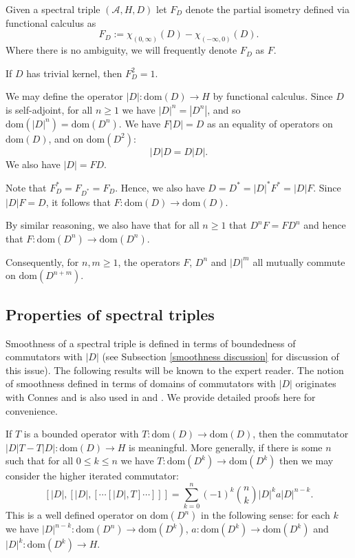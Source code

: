     \begin{defi}
    Given a spectral triple $(\mathcal{A},H,D)$ let $F_D$ denote the partial isometry defined via functional calculus as
    $$F_D := \chi_{(0,\infty)}(D)-\chi_{(-\infty,0)}(D).$$
    Where there is no ambiguity, we will frequently denote $F_D$ as $F$.        
    \end{defi}
    If $D$ has trivial kernel, then $F_D^2 = 1.$
    
    We may define the operator $|D|:\mathrm{dom}(D)\to H$ by functional calculus.
    Since $D$ is self-adjoint, for all $n\geq 1$ we have $|D|^n = |D^n|$, and so $\mathrm{dom}(|D|^n) = \mathrm{dom}(D^n)$.
    We have $F|D| = D$ as an equality of operators on $\mathrm{dom}(D)$, and on $\mathrm{dom}(D^2)$:
    \begin{equation*}
        |D|D = D|D|.
    \end{equation*}
    We also have $|D|=FD$.
    
    Note that $F_D^* = F_{D^*} = F_D$. Hence, we also have $D = D^*=|D|^*F^* = |D|F$.
    Since $|D|F = D$, it follows that $F:\mathrm{dom}(D)\to\mathrm{dom}(D)$.
    
    By similar reasoning, we also have that for all $n\geq 1$ that $D^{n}F = FD^{n}$ and hence that $F:\mathrm{dom}(D^n)\to \mathrm{dom}(D^n)$.
    
    
    Consequently, for $n,m \geq 1$, the operators $F$, $D^n$ and $|D|^m$ all mutually commute on $\mathrm{dom}(D^{n+m})$.
    
\subsection{Properties of spectral triples}
    Smoothness of a spectral triple is defined in terms of boundedness of commutators with $|D|$ (see Subsection \ref{smoothness discussion} for discussion of this issue).
    The following results will be known to the expert reader. The notion of smoothness defined in terms of domains of commutators with $|D|$ originates with Connes \cite[Section 1]{Connes-original-spectral-1995} and
    is also used in \cite{Connes-Moscovici} and \cite[Section 1.3]{CGRS2}. We provide detailed proofs here for convenience.
    
    If $T$ is a bounded operator with $T:\mathrm{dom}(D)\to \mathrm{dom}(D)$, then the commutator
    $|D|T-T|D|:\mathrm{dom}(D)\to H$ is meaningful. More generally, if there is some $n$ such that for all $0 \leq k \leq n$ we
    have $T:\mathrm{dom}(D^k)\to \mathrm{dom}(D^k)$ then we may consider the higher iterated commutator:
    \begin{equation}\label{nth iterated commutator}
        [|D|,[|D|,[\cdots [|D|,T]\cdots]]] = \sum_{k=0}^n (-1)^k \binom{n}{k}|D|^ka|D|^{n-k}.
    \end{equation}
    This is a well defined operator on $\mathrm{dom}(D^n)$ in the following sense: for each $k$ we have $|D|^{n-k}:\mathrm{dom}(D^n)\to\mathrm{dom}(D^k)$,
    $a:\mathrm{dom}(D^k)\to\mathrm{dom}(D^k)$ and $|D|^k:\mathrm{dom}(D^k)\to H$.
    
